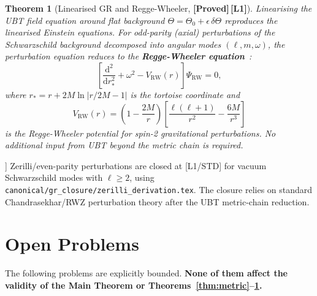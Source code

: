 \documentclass[12pt,a4paper]{article}
\newtheorem{theorem}{Theorem}[section]
\theoremstyle{definition}
\theoremstyle{remark}
\newcommand{\PROVED}{\textbf{[Proved]}}
\newcommand{\Lone}{\textbf{[L1]}}
\begin{document}
\begin{theorem}[Linearised GR and Regge-Wheeler, \PROVED\,\Lone]
\label{thm:rw}
Linearising the UBT field equation around flat background
$\Theta = \Theta_0 + \epsilon\,\delta\Theta$
reproduces the linearised Einstein equations.
For odd-parity (axial) perturbations of the Schwarzschild background
decomposed into angular modes $(\ell,m,\omega)$,
the perturbation equation reduces to the
\textbf{Regge-Wheeler equation}~\cite{regge_wheeler1957}:
\[
  \left[\frac{\mathrm{d}^2}{\mathrm{d}r_*^2} + \omega^2
        - V_{\mathrm{RW}}(r)\right]\Psi_{\mathrm{RW}} = 0,
\]
where $r_* = r + 2M\ln|r/2M - 1|$ is the tortoise coordinate and
\[
  V_{\mathrm{RW}}(r)
  = \left(1 - \frac{2M}{r}\right)
    \left[\frac{\ell(\ell+1)}{r^2} - \frac{6M}{r^3}\right]
\]
is the Regge-Wheeler potential for spin-2 gravitational perturbations.
No additional input from UBT beyond the metric chain is required.
\end{theorem}

\begin{tcolorbox}[colback=green!4!white,colframe=green!45!black,
  title=Zerilli equation (even-parity graviton): CLOSED [L1/STD]]
Zerilli/even-parity perturbations are closed at [L1/STD] for vacuum
Schwarzschild modes with $\ell \ge 2$, using
\texttt{canonical/gr\_closure/zerilli\_derivation.tex}.
The closure relies on standard Chandrasekhar/RWZ perturbation theory
after the UBT metric-chain reduction.
\end{tcolorbox}

\section{Open Problems}
\label{sec:gaps}

The following problems are explicitly bounded.
\textbf{None of them affect the validity of the Main Theorem or
Theorems~\ref{thm:metric}--\ref{thm:rw}.}
\end{document}

